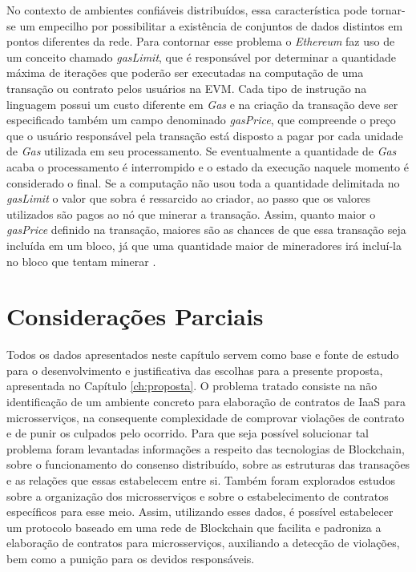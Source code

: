 %
No contexto de ambientes confiáveis distribuídos, essa característica pode tornar-se um empecilho por possibilitar a existência de conjuntos de dados distintos em pontos diferentes da rede.
%
Para contornar esse problema o \textit{Ethereum} faz uso de um conceito chamado \textit{gasLimit}, que é responsável por determinar a quantidade máxima de iterações que poderão ser executadas na computação de uma transação ou contrato pelos usuários na \ac{EVM}.
%
Cada tipo de instrução na linguagem possui um custo diferente em \textit{Gas} e na criação da transação deve ser especificado também um campo denominado \textit{gasPrice}, que compreende o preço que o usuário responsável pela transação está disposto a pagar por cada unidade de \textit{Gas} utilizada em seu processamento. Se eventualmente a quantidade de \textit{Gas} acaba o processamento é interrompido e o estado da execução naquele momento é considerado o final. Se a computação não usou toda a quantidade delimitada no \textit{gasLimit} o valor que sobra é ressarcido ao criador, ao passo que os valores utilizados são pagos ao nó que minerar a transação. Assim, quanto maior o \textit{gasPrice} definido na transação, maiores são as chances de que essa transação seja incluída em um bloco, já que uma quantidade maior de mineradores irá incluí-la no bloco que tentam minerar \cite{blockchain:ethereum}.

\section{Considerações Parciais}
\label{sec:consideracoes_parciais}

Todos os dados apresentados neste capítulo servem como base e fonte de estudo para o desenvolvimento e justificativa das escolhas para a presente proposta, apresentada no Capítulo \ref{ch:proposta}. O problema tratado consiste na não identificação de um ambiente concreto para elaboração de contratos de \ac{IaaS} para microsserviços, na consequente complexidade de comprovar violações de contrato e de punir os culpados pelo ocorrido. Para que seja possível solucionar tal problema foram levantadas informações a respeito das tecnologias de Blockchain, sobre o funcionamento do consenso distribuído, sobre as estruturas das transações e as relações que essas estabelecem entre si. Também foram explorados estudos sobre a organização dos microsserviços e sobre o estabelecimento de contratos específicos para esse meio. Assim, utilizando esses dados, é possível estabelecer um protocolo baseado em uma rede de Blockchain que facilita e padroniza a elaboração de contratos para microsserviços, auxiliando a detecção de violações, bem como a punição para os devidos responsáveis.
